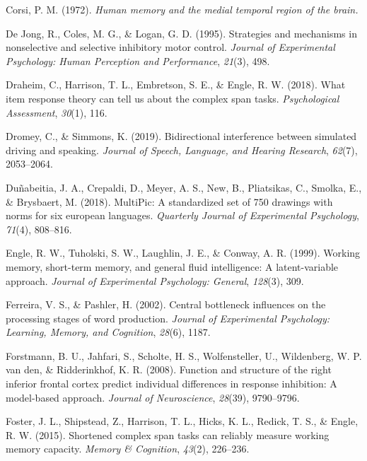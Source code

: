 \documentclass[
  man,floatsintext]{apa6}
\newlength{\cslhangindent}
\newlength{\cslentryspacingunit} %
\newenvironment{CSLReferences}[2] %
 {%
  \setlength{\parindent}{0pt}
  \ifodd #1
  \let\oldpar\par
  \def\par{\hangindent=\cslhangindent\oldpar}
  \fi
  \setlength{\parskip}{#2\cslentryspacingunit}
 }%
 {}
\begin{document}
\begin{CSLReferences}{1}{0}
\leavevmode{}%
Corsi, P. M. (1972). \emph{Human memory and the medial temporal region of the brain.}

\leavevmode{}%
De Jong, R., Coles, M. G., \& Logan, G. D. (1995). Strategies and mechanisms in nonselective and selective inhibitory motor control. \emph{Journal of Experimental Psychology: Human Perception and Performance}, \emph{21}(3), 498.

\leavevmode{}%
Draheim, C., Harrison, T. L., Embretson, S. E., \& Engle, R. W. (2018). What item response theory can tell us about the complex span tasks. \emph{Psychological Assessment}, \emph{30}(1), 116.

\leavevmode{}%
Dromey, C., \& Simmons, K. (2019). Bidirectional interference between simulated driving and speaking. \emph{Journal of Speech, Language, and Hearing Research}, \emph{62}(7), 2053--2064.

\leavevmode{}%
Duñabeitia, J. A., Crepaldi, D., Meyer, A. S., New, B., Pliatsikas, C., Smolka, E., \& Brysbaert, M. (2018). MultiPic: A standardized set of 750 drawings with norms for six european languages. \emph{Quarterly Journal of Experimental Psychology}, \emph{71}(4), 808--816.

\leavevmode{}%
Engle, R. W., Tuholski, S. W., Laughlin, J. E., \& Conway, A. R. (1999). Working memory, short-term memory, and general fluid intelligence: A latent-variable approach. \emph{Journal of Experimental Psychology: General}, \emph{128}(3), 309.

\leavevmode{}%
Ferreira, V. S., \& Pashler, H. (2002). Central bottleneck influences on the processing stages of word production. \emph{Journal of Experimental Psychology: Learning, Memory, and Cognition}, \emph{28}(6), 1187.

\leavevmode{}%
Forstmann, B. U., Jahfari, S., Scholte, H. S., Wolfensteller, U., Wildenberg, W. P. van den, \& Ridderinkhof, K. R. (2008). Function and structure of the right inferior frontal cortex predict individual differences in response inhibition: A model-based approach. \emph{Journal of Neuroscience}, \emph{28}(39), 9790--9796.

\leavevmode{}%
Foster, J. L., Shipstead, Z., Harrison, T. L., Hicks, K. L., Redick, T. S., \& Engle, R. W. (2015). Shortened complex span tasks can reliably measure working memory capacity. \emph{Memory \& Cognition}, \emph{43}(2), 226--236.


\end{CSLReferences}
\end{document}
